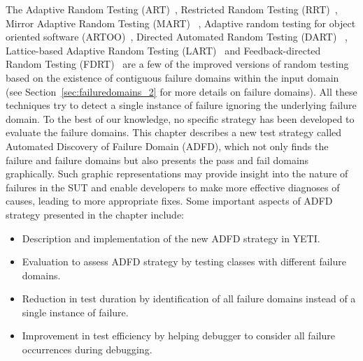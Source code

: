 The Adaptive Random Testing (ART)~\cite{chen2005adaptive}, Restricted Random Testing (RRT)~\cite{chan2006restricted}, Mirror Adaptive Random Testing (MART) ~\cite{chen2004mirror}, Adaptive random testing for object oriented software (ARTOO)~\cite{ciupa2008artoo}, Directed Automated Random Testing (DART) ~\cite{godefroid2005dart}, Lattice-based Adaptive Random Testing (LART)~\cite{mayer2005lattice} and Feedback-directed Random Testing (FDRT)~\cite{pacheco2007randoop, pacheco2007feedback} are a few of the improved versions of random testing based on the existence of contiguous failure domains within the input domain (see Section~\ref{sec:failuredomains_2} for more details on failure domains). All these techniques try to detect a single instance of failure ignoring the underlying failure domain. To the best of our knowledge, no specific strategy has been developed to evaluate the failure domains. This chapter describes a new test strategy called Automated Discovery of Failure Domain (ADFD), which not only finds the failure and failure domains but also presents the pass and fail domains graphically. Such graphic representations may provide insight into the nature of failures in the SUT and enable developers to make more effective diagnoses of causes, leading to more appropriate fixes. Some important aspects of ADFD strategy presented in the chapter include:
\newpage
\begin{itemize}
\item Description and implementation of the new ADFD strategy in YETI.
\item Evaluation to assess ADFD strategy by testing classes with different failure domains.
\item Reduction in test duration by identification of all failure domains instead of a single instance of failure.
\item Improvement in test efficiency by helping debugger to consider all failure occurrences during debugging. 
\end{itemize}






